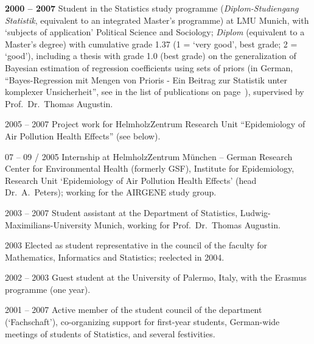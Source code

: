 \documentclass[a4paper]{simplecv}
\begin{document}
\begin{topic}
\item[\hspace*{-2ex}\bfseries 2000 -- 2007] Student in the Statistics study programme %
(\emph{Di\-plom-Studiengang Statistik}, equivalent to an integrated Master's programme) %
at LMU Munich,
with `subjects of application' Political Science and Sociology;
%
\emph{Diplom} (equivalent to a Master's degree) with cumulative grade 1.37
(1 = `very good', best grade; 2 = `good'), including a thesis
with grade 1.0 (best grade) %
on the generalization of Bayesian estimation of regression coefficients using sets of priors
(in German, ``Bayes-Regression mit Mengen von Prioris - Ein Beitrag zur Statistik unter komplexer Unsicherheit'',
see \cite{Walter2006a} in the list of publications on page~\pageref{publications}),
supervised by Prof.\ Dr.\ Thomas Augustin.

\item[2005 -- 2007] Project work for HelmholzZentrum Research Unit ``Epidemiology of Air Pollution Health Effects'' (see below).

\item[07 -- 09 / 2005] Internship at HelmholzZentrum M\"unchen -- German Research Center for Environmental Health (formerly GSF),
Institute for Epidemiology, Research Unit `Epidemiology of Air Pollution Health Effects' (head Dr.\ A.\ Peters);
working for the AIRGENE study group.

\item[2003 -- 2007] Student assistant at the Department of Statistics, Ludwig-Maximi\-li\-ans-Uni\-ver\-si\-ty Munich,
working for Prof.\ Dr.\ Thomas Augustin.

\item[2003] Elected as student representative in the council of the faculty for Mathematics, Informatics and Statistics; reelected in 2004.

\item[2002 -- 2003] Guest student at the University of Palermo, Italy, with the Erasmus programme (one year). %

\item[2001 -- 2007] Active member of the student council of the department (`Fachschaft'),
co-organizing support for first-year students, German-wide meetings of students of Statistics, and several festivities.



\end{topic}
\end{document}
